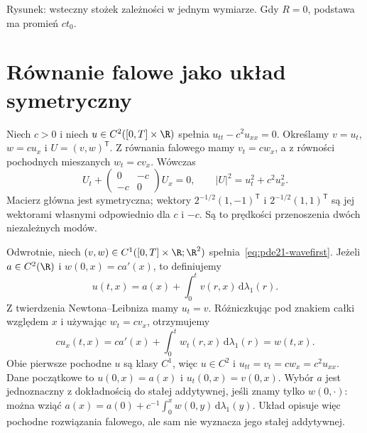 \begin{center}

\small Rysunek: wsteczny stożek zależności w jednym wymiarze.
Gdy $R=0$, podstawa ma promień $ct_0$.
\end{center}

\section{Równanie falowe jako układ symetryczny}
Niech $c>0$ i niech $u\in C^2([0,T]\times\R)$
spełnia $u_{tt}-c^2u_{xx}=0$. Określamy $v=u_t$,
$w=cu_x$ i $U=(v,w)^\mathsf T$.
Z równania falowego mamy $v_t=cw_x$, a z równości
pochodnych mieszanych $w_t=cv_x$. Wówczas
\begin{equation}\label{eq:pde21-wavefirst}
 U_t+\begin{pmatrix}0&-c\\-c&0\end{pmatrix}U_x=0,
 \qquad |U|^2=u_t^2+c^2u_x^2.
\end{equation}
Macierz główna jest symetryczna; wektory
$2^{-1/2}(1,-1)^\mathsf T$ i $2^{-1/2}(1,1)^\mathsf T$
są jej wektorami własnymi odpowiednio dla $c$ i $-c$.
Są to prędkości przenoszenia dwóch niezależnych modów.

Odwrotnie, niech $(v,w)\in C^1([0,T]\times\R;\R^2)$
spełnia~\eqref{eq:pde21-wavefirst}.
Jeżeli $a\in C^2(\R)$ i $w(0,x)=ca'(x)$, to definiujemy
\[
 u(t,x)=a(x)+\int_0^t v(r,x)\,\mathrm d\lambda_1(r).
\]
Z twierdzenia Newtona--Leibniza mamy $u_t=v$.
Różniczkując pod znakiem całki względem $x$ i używając
$w_t=cv_x$, otrzymujemy
\[
 cu_x(t,x)=ca'(x)+\int_0^t w_t(r,x)\,\mathrm d\lambda_1(r)
 =w(t,x).
\]
Obie pierwsze pochodne $u$ są klasy $C^1$, więc
$u\in C^2$ i $u_{tt}=v_t=cw_x=c^2u_{xx}$.
Dane początkowe to $u(0,x)=a(x)$ i $u_t(0,x)=v(0,x)$.
Wybór $a$ jest jednoznaczny z dokładnością do
stałej addytywnej, jeśli znamy tylko $w(0,\cdot)$:
można wziąć $a(x)=a(0)+c^{-1}\int_0^x w(0,y)\,
\mathrm d\lambda_1(y)$. Układ opisuje więc pochodne
rozwiązania falowego, ale sam nie wyznacza jego
stałej addytywnej.

